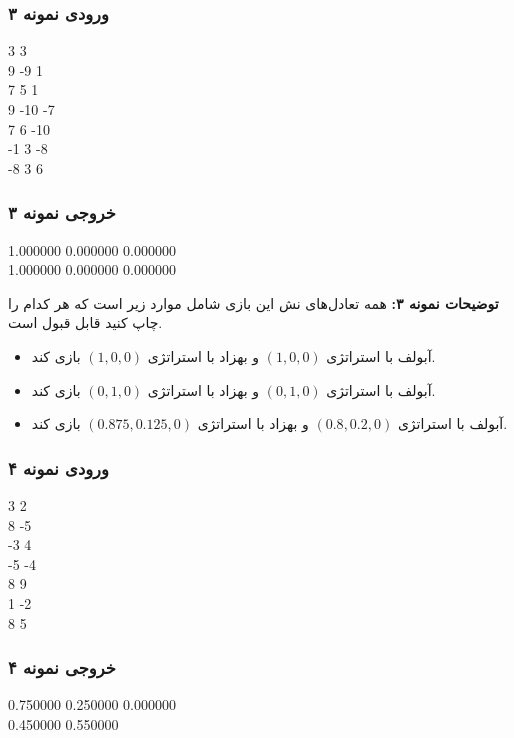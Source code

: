 \subsubsection*{ورودی نمونه ۳}
\LTR
\begin{latin}
\begin{examplebox}
    3 3 \\
    9 -9 1 \\
    7 5 1 \\
    9 -10 -7 \\
    7 6 -10 \\
    -1 3 -8 \\
    -8 3 6
\end{examplebox}
\end{latin}
\RTL
\subsubsection*{خروجی نمونه ۳}
\LTR
\begin{latin}
\begin{examplebox}
    1.000000 0.000000 0.000000 \\
    1.000000 0.000000 0.000000
\end{examplebox}
\end{latin}
\RTL
\textbf{توضیحات نمونه ۳:} همه تعادل‌های نش این بازی شامل موارد زیر است که هر کدام را چاپ کنید قابل قبول است.
\begin{itemize}
\item
آبولف با استراتژی
$(1, 0, 0)$
و بهزاد با استراتژی
$(1, 0, 0)$
بازی کند.
\item
آبولف با استراتژی
$(0, 1, 0)$
و بهزاد با استراتژی
$(0, 1, 0)$
بازی کند.
\item
آبولف با استراتژی
$(0.8, 0.2, 0)$
و بهزاد با استراتژی
$(0.875, 0.125, 0)$
بازی کند.
\end{itemize}
\subsubsection*{ورودی نمونه ۴}
\LTR
\begin{latin}
\begin{examplebox}
    3 2 \\
    8 -5 \\
    -3 4 \\
    -5 -4 \\
    8 9 \\
    1 -2 \\
    8 5
\end{examplebox}
\end{latin}
\RTL
\subsubsection*{خروجی نمونه ۴}
\LTR
\begin{latin}
\begin{examplebox}
    0.750000 0.250000 0.000000 \\ 
    0.450000 0.550000
\end{examplebox}
\end{latin}
\RTL
